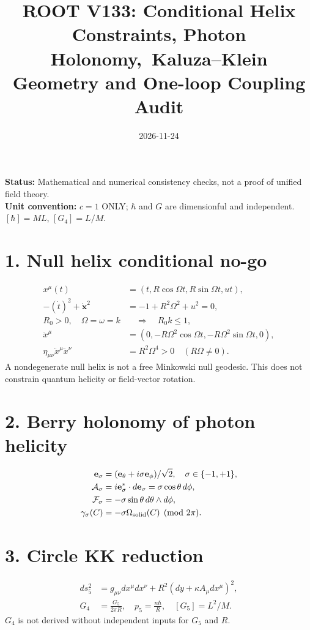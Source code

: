 \documentclass[11pt]{article}
\begin{document}
\title{ROOT V133: Conditional Helix Constraints, Photon Holonomy,\ Kaluza--Klein Geometry and One-loop Coupling Audit}
\date{2026-11-24}
\maketitle
\noindent\textbf{Status:} Mathematical and numerical consistency checks, not a proof of unified field theory. \\
\textbf{Unit convention:} $c=1$ ONLY; $\hbar$ and $G$ are dimensionful and independent. $[\hbar]=ML$, $[G_4]=L/M$.
\section*{1. Null helix conditional no-go}
\begin{align}
 x^\mu(t)&=(t,R\cos\Omega t,R\sin\Omega t,ut),\\
 -(\dot t)^2+\dot{\mathbf x}^2&=-1+R^2\Omega^2+u^2=0,\\
 R_0>0,\quad \Omega=\omega=k&\quad\Longrightarrow\quad R_0 k\le 1,\\
 \ddot x^\mu&=(0,-R\Omega^2\cos\Omega t,-R\Omega^2\sin\Omega t,0),\\
 \eta_{\mu\nu}\ddot x^\mu\ddot x^\nu&=R^2\Omega^4>0\quad(R\Omega\ne0).
\end{align}
A nondegenerate null helix is not a free Minkowski null geodesic. This does not constrain quantum helicity or field-vector rotation.
\section*{2. Berry holonomy of photon helicity}
\begin{align}
 \mathbf e_\sigma&=(\mathbf e_\theta+i\sigma\mathbf e_\phi)/\sqrt 2,\quad\sigma\in\{-1,+1\},\\
 \mathcal A_\sigma&=i\mathbf e_\sigma^*\cdot d\mathbf e_\sigma=\sigma\cos\theta\,d\phi,\\
 \mathcal F_\sigma&=-\sigma\sin\theta\,d\theta\wedge d\phi,\\
 \gamma_\sigma(C)&=-\sigma\Omega_{\rm solid}(C)\pmod{2\pi}.
\end{align}
\section*{3. Circle KK reduction}
\begin{align}
 ds_5^2&=g_{\mu\nu}dx^\mu dx^\nu+R^2(dy+\kappa A_\mu dx^\mu)^2,\\
 G_4&=\frac{G_5}{2\pi R},\quad p_5=\frac{n\hbar}{R},\quad [G_5]=L^2/M.
\end{align}
$G_4$ is not derived without independent inputs for $G_5$ and $R$.
\end{document}
